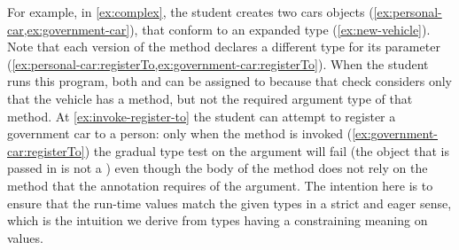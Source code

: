 For example, in \cref{ex:complex}, the student
creates two cars objects
(\cref{ex:personal-car,ex:government-car}),
that conform to
an expanded  type (\cref{ex:new-vehicle}).
Note that each version of the  method
declares a different type for its parameter
(\cref{ex:personal-car:registerTo,ex:government-car:registerTo}).
When the student runs this program, both  and
 can be assigned to  because that
check considers only that the vehicle has a  method,
but not the required argument type of that method.
At \cref{ex:invoke-register-to} the student can attempt to register a
government car to a person: only when the method is invoked
(\cref{ex:government-car:registerTo}) the gradual type test on the
argument will fail (the object that is passed in is not a
) even though the body of the  method
does not rely on the  method that the 
annotation requires of the argument.
The intention here is to ensure that the run-time values
match the given types in a strict and eager sense,
which is the intuition we derive from types having a constraining meaning
on values.




